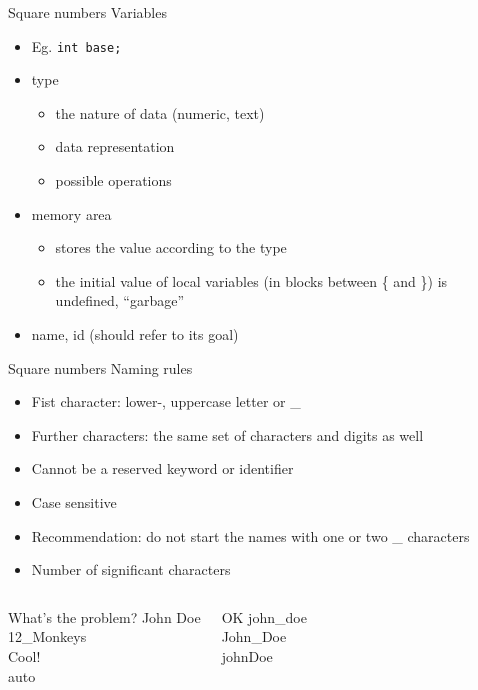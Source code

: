 \documentclass[usenames,dvipsnames,aspectratio=169]{beamer}
\newcommand{\kiemel}[1]{{\color{kiemelesszin}#1}}
\begin{document}
\begin{frame}{Square numbers}
  Variables
  \begin{itemize}
    \item Eg. \texttt{int base;}
    \item type
    \begin{itemize}
      \item the nature of data (numeric, text)
      \item data representation
      \item possible operations
    \end{itemize}
    \item memory area
    \begin{itemize}
      \item stores the value according to the type
      \item the initial value of local variables (in blocks between \kiemel{\{} and \kiemel{\}}) is undefined, ``garbage''
    \end{itemize}
    \item name, id (should refer to its goal)
  \end{itemize}
\end{frame}

\begin{frame}{Square numbers}
  Naming rules
  \begin{itemize}
    \item Fist character: lower-, uppercase letter or \_
    \item Further characters: the same set of characters and digits as well
    \item Cannot be a reserved keyword or identifier
    \item Case sensitive
    \item Recommendation: do not start the names with one or two \_ characters
    \item Number of significant characters
  \end{itemize}
  \begin{columns}[T]
      \begin{alertblock}{What's the problem?}
        John Doe\\
        12\_Monkeys\\
        Cool!\\
        auto
      \end{alertblock}
      \begin{exampleblock}{OK}
        john\_doe\\
        John\_Doe\\
        johnDoe
      \end{exampleblock}
  \end{columns}
\end{frame}
\end{document}
